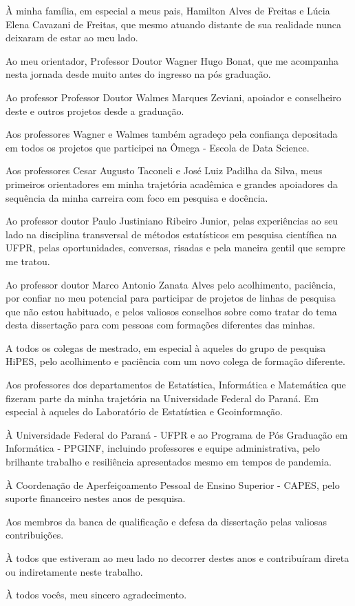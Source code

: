 \begin{agradece}	%

À minha família, em especial a meus pais, Hamilton Alves de Freitas e Lúcia Elena Cavazani de Freitas, que mesmo atuando distante de sua realidade nunca deixaram de estar ao meu lado.

Ao meu orientador, Professor Doutor Wagner Hugo Bonat, que me acompanha nesta jornada desde muito antes do ingresso na pós graduação.

Ao professor Professor Doutor Walmes Marques Zeviani, apoiador e conselheiro deste e outros projetos desde a graduação.

Aos professores Wagner e Walmes também agradeço pela confiança depositada em todos os projetos que participei na Ômega - Escola de Data Science.

Aos professores Cesar Augusto Taconeli e José Luiz Padilha da Silva, meus primeiros orientadores em minha trajetória acadêmica e grandes apoiadores da sequência da minha carreira com foco em pesquisa e docência.

Ao professor doutor Paulo Justiniano Ribeiro Junior, pelas experiências ao seu lado na disciplina transversal de métodos estatísticos em pesquisa científica na UFPR, pelas oportunidades, conversas, risadas e pela maneira gentil que sempre me tratou.

Ao professor doutor Marco Antonio Zanata Alves pelo acolhimento, paciência, por confiar no meu potencial para participar de projetos de linhas de pesquisa que não estou habituado, e pelos valiosos conselhos sobre como tratar do tema desta dissertação para com pessoas com formações diferentes das minhas.

A todos os colegas de mestrado, em especial à aqueles do grupo de pesquisa HiPES, pelo acolhimento e paciência com um novo colega de formação diferente.

Aos professores dos departamentos de Estatística, Informática e Matemática que fizeram parte da minha trajetória na Universidade Federal do Paraná. Em especial à aqueles do Laboratório de Estatística e Geoinformação. 

À Universidade Federal do Paraná - UFPR e ao Programa de Pós Graduação em Informática - PPGINF, incluindo professores e equipe administrativa, pelo brilhante trabalho e resiliência apresentados mesmo em tempos de pandemia.

À Coordenação de Aperfeiçoamento Pessoal de Ensino Superior - CAPES, pelo suporte financeiro nestes anos de pesquisa.

Aos membros da banca de qualificação e defesa da dissertação pelas valiosas contribuições.

À todos que estiveram ao meu lado no decorrer destes anos e contribuíram direta ou indiretamente neste trabalho. 

À todos vocês, meu sincero agradecimento.

\end{agradece}
